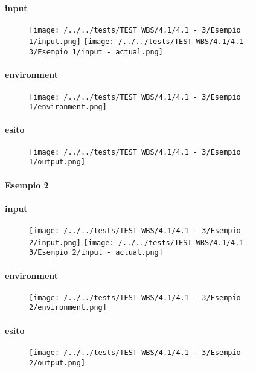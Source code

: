 \paragraph{input}
\begin{figure}
\centering
\texttt{[image: /../../tests/TEST WBS/4.1/4.1 - 3/Esempio 1/input.png]}
\texttt{[image: /../../tests/TEST WBS/4.1/4.1 - 3/Esempio 1/input - actual.png]}
\end{figure}
\paragraph{environment}
\begin{figure}
\centering
\texttt{[image: /../../tests/TEST WBS/4.1/4.1 - 3/Esempio 1/environment.png]}
\end{figure}
\paragraph{esito}
\begin{figure}
\centering
\texttt{[image: /../../tests/TEST WBS/4.1/4.1 - 3/Esempio 1/output.png]}
\end{figure}

\paragraph{Esempio 2}
\paragraph{input}
\begin{figure}
\centering
\texttt{[image: /../../tests/TEST WBS/4.1/4.1 - 3/Esempio 2/input.png]}
\texttt{[image: /../../tests/TEST WBS/4.1/4.1 - 3/Esempio 2/input - actual.png]}
\end{figure}
\paragraph{environment}
\begin{figure}
\centering
\texttt{[image: /../../tests/TEST WBS/4.1/4.1 - 3/Esempio 2/environment.png]}
\end{figure}
\paragraph{esito}
\begin{figure}
\centering
\texttt{[image: /../../tests/TEST WBS/4.1/4.1 - 3/Esempio 2/output.png]}
\end{figure}

